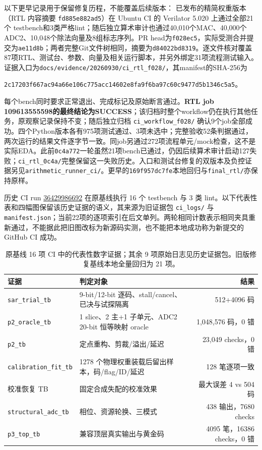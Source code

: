 \documentclass[UTF8,fontset=fandol,11pt,a4paper,openany]{ctexrep}
\newcommand{\code}[1]{\nolinkurl{#1}}
\begin{document}
以下更早记录用于保留修复历程，不能覆盖后续版本：
已发布的精简权重版本（RTL 内容摘要 \code{fd885e882ad5}）在 Ubuntu CI 的 Verilator 5.020 上通过全部21个 testbench和3类严格lint；随后独立算术审计也通过40,010个MAC、40,000个ADC2、10,048个除法向量及8组标志序列。PR head为\code{f028ec5}，实际受测合并提交为\code{ae11d8b}；两者完整Git文件树相同，摘要为\code{d84022bd8319}。逐文件核对覆盖87项RTL、测试台、参数、向量及相关运行脚本，并另外绑定31项流程测试输入。证据入口为\code{docs/evidence/20260930/ci_rtl_f028/}，其manifest的SHA-256为
\par\noindent\code{2c17203f667ac94a66e106c775acc14602e8fa9f6ba97c60c9477d5b1346c5a5}。
\par{}每个bench同时要求正常退出、完成标记及原始断言通过。\textbf{RTL job 109613555598的最终结论为SUCCESS}；该归档时整个workflow仍在执行其他任务，原观察记录保持不变；随后独立归档 \code{ci_workflow_f028/} 确认9个job全部成功。四个Python版本各有975项测试通过、3项未选中；完整验收52条判据通过，两次运行的结果文件逐字节一致。同job另通过272项流程单元/mock检查，这不是实际EDA。此前\code{0c4a772}一轮虽然21项bench已通过，仍因后续算术审计启动127失败；\code{ci_rtl_0c4a/}完整保留这一失败历史。入口和测试台修复的双版本及负控证据另见\code{arithmetic_runner_ci/}。更早的\code{169f957dc7fe}本地回归与\code{final_rtl/}亦保持原样。

历史 CI run \href{https://github.com/defineiocc02/20bit_SAR_ADC_Behaviour_Verification/actions/runs/36429986692}{36429986692} 在原基线执行 16 个 testbench 与 3 类 lint。以下代表性表和四幅图保留该历史证据的语义，其来源为旧证据包 \code{ci_logs/} 与 \code{manifest.json}；当前22项的逐项索引在后文单列。两轮相同计数表示相同夹具重新通过，不能据此把旧图改标为新源码实测，也不能把本地成功称为新提交的 GitHub CI 成功。

\begin{table}[H]\centering\small
\begin{tabularx}{\textwidth}{p{34mm}Xr}\toprule 证据&判定对象&结果\\\midrule
\code{sar_trial_tb}&9-bit/12-bit 逐码、stall/cancel、已决与试探隔离&512+4096 码\\
\code{p2_oracle_tb}&1 slice、2 主+1 子单元、ADC2 20-bit 恒等映射 oracle&1,048,576 码，0 错\\
\code{p2_tb}&定点重构、剪裁/溢出/延迟&23,049 checks，0 错\\
\code{calibration_fit_tb}&1278 个物理权重装载后留出样本，码/flag/ID/延迟&128 笔逐项一致\\
校准恢复 TB&固定合成失配的校准效果&最大误差 4 vs 504 码\\
\code{structural_adc_tb}&相位、资源轮换、三模式&438 输出，7680 checks\\
\code{p3_top_tb}&兼容顶层真实输出与黄金码&4095 笔，16386 checks，0 错\\
\bottomrule\end{tabularx}
\caption{原基线 16 项 CI 中的代表性数字证据；其余 9 项原始日志见历史证据包。旧版修复基线本地全量回归为 21 项。}
\end{table}
\end{document}
